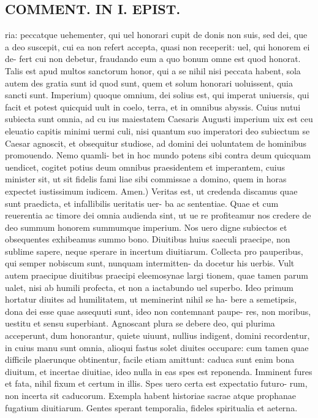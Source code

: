 \documentclass{article}
\begin{document}
\begin{pages}
\section*{COMMENT. IN I. EPIST. }
\marginpar{[ p.540 ]}\pstart ria: peccatque uehementer, qui uel honorari cupit de donis non suis, sed dei, que a deo suscepit, cui ea non refert accepta, quasi non receperit: uel, qui honorem ei de- fert cui non debetur, fraudando eum a quo bonum omne est quod honorat. Talis est apud multos sanctorum honor, qui a se nihil nisi peccata habent, sola autem des gratia sunt id quod sunt, quem et solum honorari uoluissent, quia sancti sunt. Imperium) quoque omnium, dei solius est, qui imperat uniuersis, qui facit et potest quicquid uult in coelo, terra, et in omnibus abyssis. Cuius nutui subiecta sunt omnia, ad cu ius maiestatem Caesaris Augusti imperium uix est ceu eleuatio capitis minimi uermi culi, nisi quantum suo imperatori deo subiectum se Caesar agnoscit, et obsequitur studiose, ad domini dei uoluntatem de hominibus promouendo. Nemo quamli- bet in hoc mundo potens sibi contra deum quicquam uendicet, cogitet potius deum omnibus praesidentem et imperantem, cuius minister sit, ut sit fidelis fami liae sibi commissae a domino, quem in horas expectet iustissimum iudicem. Amen.) Veritas est, ut credenda discamus quae sunt praedicta, et infallibilis ueritatis uer- ba ac sententiae. Quae et cum reuerentia ac timore dei omnia audienda sint, ut ue re profiteamur nos credere de deo summum honorem summumque imperium. Nos uero digne subiectos et obsequentes exhibeamus summo bono.  \pend\pstart Diuitibus huius saeculi praecipe, non sublime sapere, neque sperare in incertum diuitiarum.  \pend\pstart Collecta pro pauperibus, qui semper nobiscum sunt, nunquam intermitten- da docetur his uerbis. Vult autem praecipue diuitibus praecipi eleemosynae largi tionem, quae tamen parum ualet, nisi ab humili profecta, et non a iactabundo uel superbo. Ideo primum hortatur diuites ad humilitatem, ut meminerint nihil se ha- bere a semetipsis, dona dei esse quae assequuti sunt, ideo non contemnant paupe- res, non moribus, uestitu et sensu superbiant. Agnoscant plura se debere deo, qui plurima acceperunt, dum honorantur, quiete uiuunt, nullius indigent, domini recordentur, in cuius manu sunt omnia, alioqui fastus solet diuites occupare: cum tamen quae difficile plaerunque obtinentur, facile etiam amittunt: caduca sunt enim bona diuitum, et incertae diuitiae, ideo nulla in eas spes est reponenda. Imminent fures et fata, nihil fixum et certum in illis. Spes uero certa est expectatio futuro- rum, non incerta sit caducorum. Exempla habent historiae sacrae atque prophanae fugatium diuitiarum. Gentes sperant temporalia, fideles spiritualia et aeterna.  \pend
{}
{}

\end{pages}
\end{document}
